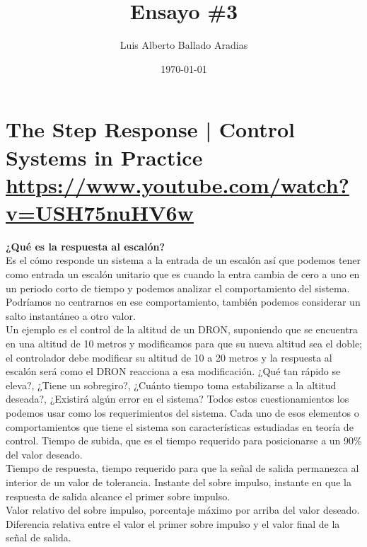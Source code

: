 \documentclass[
	12pt, %
]{fphw}
\title{Ensayo \#3} %
\author{Luis Alberto Ballado Aradias} %
\date{\today} %
\institute{Centro de Investigación y de Estudios Avanzados del IPN \\ Unidad Tamaulipas} %
\begin{document}
\maketitle %

\section*{{\color{Apricot}The Step Response | Control Systems in Practice} \url{https://www.youtube.com/watch?v=USH75nuHV6w}}

\textbf{¿Qué es la respuesta al escalón?} \\

Es el cómo responde un sistema a la entrada de un escalón así que podemos tener como entrada un escalón unitario que es cuando la entra cambia de cero a uno en un periodo corto de tiempo y podemos analizar el comportamiento del sistema. Podríamos no centrarnos en ese comportamiento, también podemos considerar un salto instantáneo a otro valor. \\

Un ejemplo es el control de la altitud de un DRON, suponiendo que se encuentra en una altitud de 10 metros y modificamos para que su nueva altitud sea el doble; el controlador debe modificar su altitud de 10 a 20 metros y la respuesta al escalón será como el DRON reacciona a esa modificación. ¿Qué tan rápido se eleva?, ¿Tiene un sobregiro?, ¿Cuánto tiempo toma estabilizarse a la altitud deseada?, ¿Existirá algún error en el sistema? Todos estos cuestionamientos los podemos usar como los requerimientos del sistema. Cada uno de esos elementos o comportamientos que tiene el sistema son características estudiadas en teoría de control.
Tiempo de subida, que es el tiempo requerido para posicionarse a un 90\% del valor deseado.\\

Tiempo de respuesta, tiempo requerido para que la señal de salida permanezca al interior de un valor de tolerancia.
Instante del sobre impulso, instante en que la respuesta de salida alcance el primer sobre impulso. \\

Valor relativo del sobre impulso, porcentaje máximo por arriba del valor deseado. Diferencia relativa entre el valor el primer sobre impulso y el valor final de la señal de salida.\\
\end{document}
